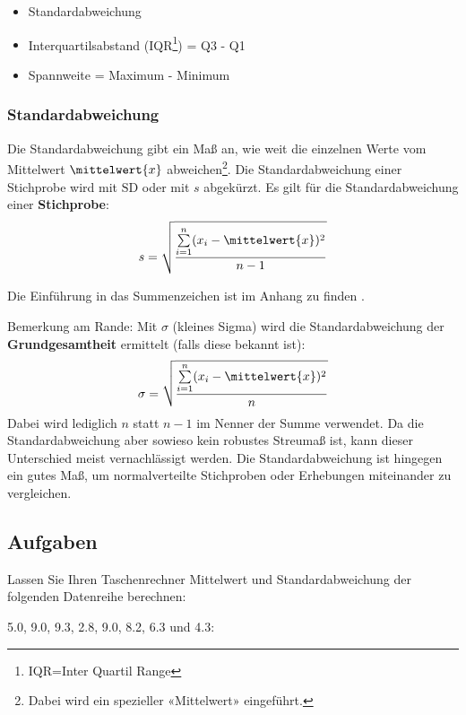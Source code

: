 \begin{itemize}
\item Standardabweichung

\item Interquartilsabstand (IQR\footnote{IQR=Inter Quartil
    Range}) = Q3 - Q1

\item Spannweite = Maximum - Minimum

\end{itemize}
\newpage


\subsubsection{Standardabweichung}



Die Standardabweichung gibt ein Maß an, wie weit die einzelnen Werte
vom Mittelwert $\mittelwert{x}$ abweichen\footnote{Dabei wird ein spezieller «Mittelwert»
  eingeführt.}.
Die Standardabweichung einer Stichprobe wird mit $\text{SD}$ oder
mit $s$ abgekürzt. Es gilt für die Standardabweichung einer
\textbf{Stichprobe}:
$$s = \sqrt{\frac{\sum\limits_{i=1}^n(x_i-\mittelwert{x})^2}{n-1}}$$

Die Einführung in das Summenzeichen ist im Anhang zu finden .

Bemerkung am Rande: Mit $\sigma$ (kleines Sigma) wird die
Standardabweichung der \textbf{Grundgesamtheit} ermittelt (falls diese
bekannt ist):
$$\sigma = \sqrt{\frac{\sum\limits_{i=1}^n(x_i-\mittelwert{x})^2}{n}}$$
Dabei wird lediglich $n$ statt $n-1$ im Nenner der Summe verwendet. Da
die Standardabweichung aber sowieso kein robustes Streumaß ist, kann
dieser Unterschied meist vernachlässigt werden. Die Standardabweichung ist hingegen ein gutes Maß, um normalverteilte Stichproben oder Erhebungen miteinander zu vergleichen. 

\newpage
\subsection*{Aufgaben}

Lassen Sie Ihren Taschenrechner Mittelwert und Standardabweichung der folgenden
Datenreihe berechnen:

5.0, 9.0, 9.3, 2.8, 9.0, 8.2, 6.3 und 4.3:

